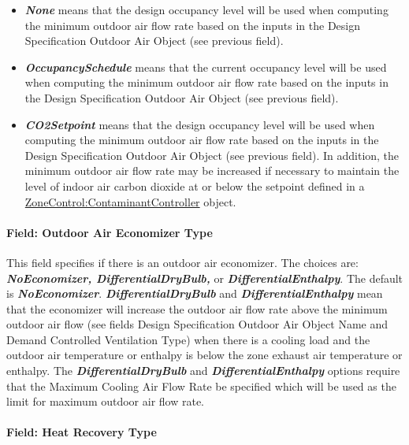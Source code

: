 \begin{itemize}
\item
  \textbf{\emph{None}} means that the design occupancy level will be used when computing the minimum outdoor air flow rate based on the inputs in the Design Specification Outdoor Air Object (see previous field).
\item
  \textbf{\emph{OccupancySchedule}} means that the current occupancy level will be used when computing the minimum outdoor air flow rate based on the inputs in the Design Specification Outdoor Air Object (see previous field).
\item
  \textbf{\emph{CO2Setpoint}} means that the design occupancy level will be used when computing the minimum outdoor air flow rate based on the inputs in the Design Specification Outdoor Air Object (see previous field). In addition, the minimum outdoor air flow rate may be increased if necessary to maintain the level of indoor air carbon dioxide at or below the setpoint defined in a \hyperref[zonecontrolcontaminantcontroller]{ZoneControl:ContaminantController} object.
\end{itemize}

\paragraph{Field: Outdoor Air Economizer Type}\label{field-outdoor-air-economizer-type-000}

This field specifies if there is an outdoor air economizer. The choices are: \textbf{\emph{NoEconomizer, DifferentialDryBulb,}} or \textbf{\emph{DifferentialEnthalpy}}. The default is \textbf{\emph{NoEconomizer}}. \textbf{\emph{DifferentialDryBulb}} and \textbf{\emph{DifferentialEnthalpy}} mean that the economizer will increase the outdoor air flow rate above the minimum outdoor air flow (see fields Design Specification Outdoor Air Object Name and Demand Controlled Ventilation Type) when there is a cooling load and the outdoor air temperature or enthalpy is below the zone exhaust air temperature or enthalpy. The \textbf{\emph{DifferentialDryBulb}} and \textbf{\emph{DifferentialEnthalpy}} options require that the Maximum Cooling Air Flow Rate be specified which will be used as the limit for maximum outdoor air flow rate.

\paragraph{Field: Heat Recovery Type}\label{field-heat-recovery-type-000}

